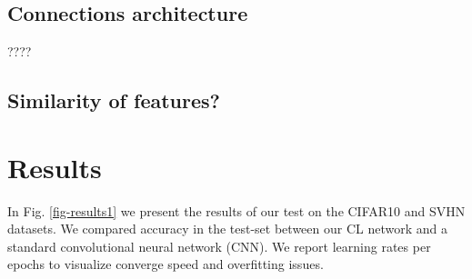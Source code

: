 \documentclass{article} %
\begin{document}
\subsection{Connections architecture}
????




\subsection{Similarity of features?}








\section{Results}
\label{sec-results}

In Fig. \ref{fig-results1} we present the results of our test on the CIFAR10 and SVHN datasets. We compared accuracy in the test-set between our CL network and a standard convolutional neural network (CNN). We report learning rates per epochs to visualize converge speed and overfitting issues.
\end{document}
